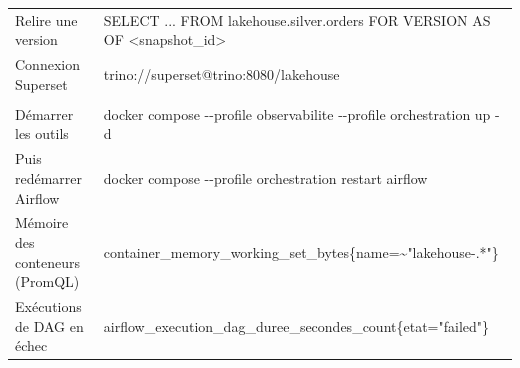 \documentclass[11pt,a4paper]{article}
\begin{document}
\begin{center}
\begin{tabularx}{\textwidth}{@{}>{\raggedright\arraybackslash}p{4.1cm} >{\raggedright\arraybackslash\ttfamily\footnotesize}X@{}}
Relire une version & SELECT ... FROM lakehouse.silver.orders FOR VERSION AS OF <snapshot\_id> \\
Connexion Superset & trino://superset@trino:8080/lakehouse \\
\midrule
\multicolumn{2}{@{}l}{\textbf{\textcolor{lhblue}{Supervision}}} \\
Démarrer les outils & docker compose -{}-profile observabilite -{}-profile orchestration up -d \\
Puis redémarrer Airflow & docker compose -{}-profile orchestration restart airflow \\
Mémoire des conteneurs (PromQL) & container\_memory\_working\_set\_bytes\{name=\~{}"lakehouse-.*"\} \\
Exécutions de DAG en échec & airflow\_execution\_dag\_duree\_secondes\_count\{etat="failed"\} \\
\bottomrule
\end{tabularx}
\end{center}
\end{document}
